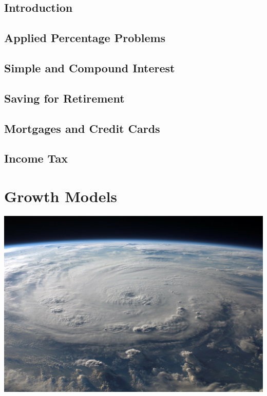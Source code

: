 \documentclass[9pt,letter,twoside,openright]{memoir}
\begin{document}
\section{Introduction}

\vfill
\pagebreak

\section{Applied Percentage Problems}



\section{Simple and Compound Interest}



\section{Saving for Retirement}



\section{Mortgages and Credit Cards}



\section{Income Tax}



\chapter{Growth Models}
\begin{center}\includegraphics[width=\textwidth]{hurricane}\end{center}
\end{document}
